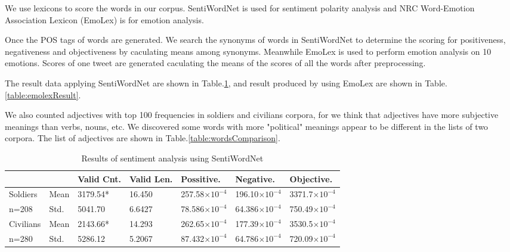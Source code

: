 We use lexicons to score the words in our corpus.
SentiWordNet is used for sentiment polarity analysis and NRC Word-Emotion Association Lexicon (EmoLex) \citep{Mohammad13} is for emotion analysis.

Once the POS tags of words are generated. We search the synonyms of words in SentiWordNet to determine the scoring for positiveness, negativeness and objectiveness by caculating means among synonyms. Meanwhile EmoLex is used to perform emotion analysis on 10 emotions. Scores of one tweet are generated caculating the means of the scores of all the words after preprocessing.

The result data applying SentiWordNet are shown in Table.\ref{table:sentiResult}, and result produced by using EmoLex are shown in Table.\ref{table:emolexResult}.

We also counted adjectives with top 100 frequencies in soldiers and civilians corpora, for we think that adjectives have more subjective meanings than verbs, nouns, etc. We discovered some words with more "political" meanings appear to be different in the lists of two corpora. The list of adjectives are shown in Table.\ref{table:wordsComparison}.


\begin{table}[h]
  \caption{Results of sentiment analysis using SentiWordNet}
  \label{table:sentiResult}
  \centering
  \renewcommand{\tabularxcolumn}{m} %
  \begin{tabularx}{\textwidth}{l l | l l l l l}
    \toprule
              &          & \textbf{Valid Cnt.} & \textbf{Valid Len.}    & \textbf{Possitive.}    & \textbf{Negative.}     & \textbf{Objective.}
    \tabularnewline \midrule
    Soldiers  & Mean
              & 3179.54* & 16.450              & 257.58$\times 10^{-4}$ & 196.10$\times 10^{-4}$ & 3371.7$\times 10^{-4}$
    \tabularnewline
    n=208     & Std.
              & 5041.70  & 6.6427              & 78.586$\times 10^{-4}$ & 64.386$\times 10^{-4}$ & 750.49$\times 10^{-4}$
    \tabularnewline \hline \hline
    Civilians & Mean
              & 2143.66* & 14.293              & 262.65$\times 10^{-4}$ & 177.39$\times 10^{-4}$ & 3530.5$\times 10^{-4}$
    \tabularnewline
    n=280     & Std.
              & 5286.12  & 5.2067              & 87.432$\times 10^{-4}$ & 64.786$\times 10^{-4}$ & 720.09$\times 10^{-4}$
    \tabularnewline \bottomrule
  \end{tabularx}
\end{table}


